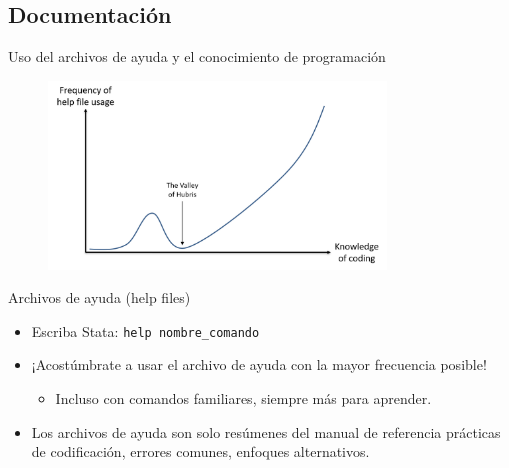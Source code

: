 \documentclass[11pt, aspectratio=169, compress]{beamer}
\begin{document}
\subsection{Documentación}
\begin{frame}{Uso del archivos de ayuda y el conocimiento de programación}
	\begin{figure}[H]
		\centering
		\includegraphics[width=0.8\textwidth]{dunning.png}
	\end{figure}	
\end{frame}
\begin{frame}{Archivos de ayuda (help files)}
	\begin{itemize}
		\item Escriba Stata: \texttt{help nombre\_comando} 
		\item ¡Acostúmbrate a usar el archivo de ayuda con la mayor frecuencia posible!
		\begin{itemize}
			\item Incluso con comandos familiares, siempre más para aprender.
		\end{itemize}
		\item Los archivos de ayuda son solo resúmenes del manual de referencia prácticas de codificación, errores comunes, enfoques alternativos.
	\end{itemize}
\end{frame}
\end{document}
